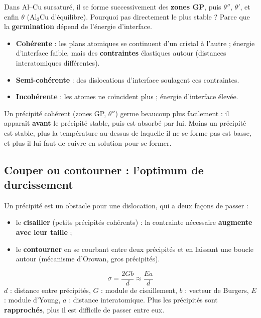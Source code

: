 Dans Al--Cu sursaturé, il se forme successivement des \textbf{zones GP}, puis $\theta''$,
$\theta'$, et enfin $\theta$ (Al$_2$Cu d'équilibre). Pourquoi pas directement le plus stable ?
Parce que la \textbf{germination} dépend de l'énergie d'interface.

\begin{defnbox}[title={Interfaces cohérentes, semi-cohérentes, incohérentes}]
\begin{itemize}
  \item \textbf{Cohérente} : les plans atomiques se continuent d'un cristal à l'autre ;
        énergie d'interface faible, mais des \textbf{contraintes} élastiques autour (distances
        interatomiques différentes).
  \item \textbf{Semi-cohérente} : des dislocations d'interface soulagent ces contraintes.
  \item \textbf{Incohérente} : les atomes ne coïncident plus ; énergie d'interface élevée.
\end{itemize}
\end{defnbox}

Un précipité cohérent (zones GP, $\theta''$) germe beaucoup plus facilement : il apparaît
\textbf{avant} le précipité stable, puis est absorbé par lui. Moins un précipité est stable,
plus la température au-dessus de laquelle il ne se forme pas est basse, et plus il lui faut de
cuivre en solution pour se former.

\subsection*{Couper ou contourner : l'optimum de durcissement}

Un précipité est un obstacle pour une dislocation, qui a deux façons de passer :
\begin{itemize}
  \item le \textbf{cisailler} (petits précipités cohérents) : la contrainte nécessaire
        \textbf{augmente avec leur taille} ;
  \item le \textbf{contourner} en se courbant entre deux précipités et en laissant une boucle
        autour (mécanisme d'Orowan, gros précipités).
\end{itemize}

\begin{thmbox}[title={Contrainte de contournement (à connaître par c\oe ur)}]
\[ \sigma = \frac{2Gb}{d} \approx \frac{Ea}{d} \]
$d$ : distance entre précipités, $G$ : module de cisaillement, $b$ : vecteur de Burgers,
$E$ : module d'Young, $a$ : distance interatomique. Plus les précipités sont
\textbf{rapprochés}, plus il est difficile de passer entre eux.
\end{thmbox}

